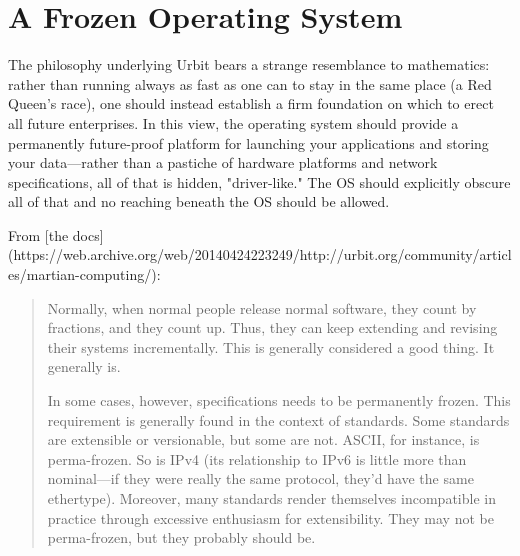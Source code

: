 {{{{\section{A Frozen Operating System}

The philosophy underlying Urbit bears a strange resemblance to mathematics:  rather than running always as fast as one can to stay in the same place (a Red Queen's race), one should instead establish a firm foundation on which to erect all future enterprises.  In this view, the operating system should provide a permanently future-proof platform for launching your applications and storing your data—rather than a pastiche of hardware platforms and network specifications, all of that is hidden, "driver-like."  The OS should explicitly obscure all of that and no reaching beneath the OS should be allowed.

From [the docs](https://web.archive.org/web/20140424223249/http://urbit.org/community/articles/martian-computing/):

\begin{quote}
Normally, when normal people release normal software, they count by fractions, and they count up.  Thus, they can keep extending and revising their systems incrementally.  This is generally considered a good thing.  It generally is.


In some cases, however, specifications needs to be permanently frozen.  This requirement is generally found in the context of standards.  Some standards are extensible or versionable, but some are not.  ASCII, for instance, is perma-frozen.  So is IPv4 (its relationship to IPv6 is little more than nominal—if they were really the same protocol, they'd have the same ethertype).  Moreover, many standards render themselves incompatible in practice through excessive enthusiasm for extensibility.  They may not be perma-frozen, but they probably should be.


\end{quote}}}}}
